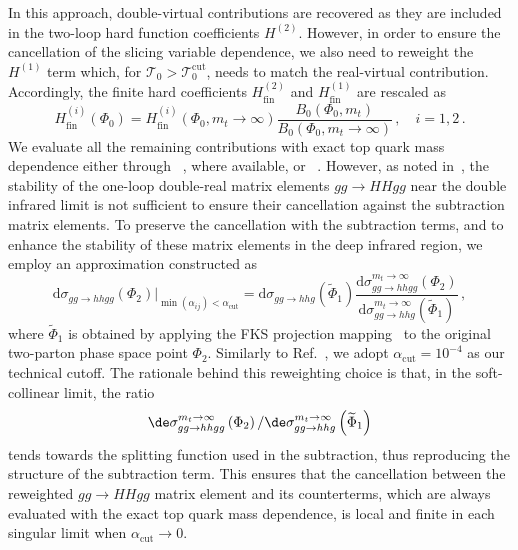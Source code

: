 In this approach, double-virtual contributions are recovered as they are included in the
two-loop hard function coefficients $H^{(2)}$.
However, in order to ensure the cancellation of the slicing variable dependence, we also need
to reweight the $H^{(1)}$ term which, for $\mathcal{T}_0>\mathcal{T}_0^{\mathrm{cut}}$,
needs to match the real-virtual contribution.
Accordingly, the finite hard coefficients $H^{(2)}_{\mathrm{fin}}$ and
$H^{(1)}_{\mathrm{fin}}$ are rescaled as
\begin{equation}
  \label{eq:twoloophard}
  H^{(i)}_{\mathrm{fin}}(\Phi_0) = H^{(i)}_{\mathrm{fin}}\left(\Phi_0,m_t\to\infty\right)
  \frac{B_0\left(\Phi_0,m_t\right)}
  {B_0\left(\Phi_0,m_t\to\infty\right)}\,, \quad i=1,2\,.
\end{equation}
We evaluate all the remaining contributions with exact top quark mass dependence
either through \openloops~\cite{Cascioli:2011va,Buccioni:2017yxi,Buccioni:2019sur}, where available, or \hhgrid~\cite{Borowka:2016ehy,Borowka:2016ypz,Heinrich:2017kxx,Davies:2019dfy}.
However, as noted in~\cite{Grazzini:2018bsd}, the stability of the one-loop double-real
matrix elements $gg \to HH gg$ near the double infrared limit is not sufficient
to ensure their cancellation against the subtraction matrix elements.
To preserve the cancellation with the subtraction terms, and to enhance
the stability of these matrix elements in the deep infrared region, we employ
an approximation constructed as
\begin{equation}
  {\mathrm{d}\sigma_{gg\to hh
      gg}\left(\Phi_2\right)\Biggr|}_{\min(\alpha_{ij})<\alpha_{\mathrm{cut}}}
  = {\mathrm{d}\sigma_{gg\to hh g}\left(\widetilde{\Phi}_1\right)}
  \frac{\mathrm{d}\sigma_{gg\to hhgg}^{m_t\to\infty}\left(\Phi_2\right)}
  {\mathrm{d}\sigma_{gg\to hh g}^{m_t\to\infty}\left(\widetilde{\Phi}_1\right)} \,,
\end{equation}
where $\widetilde{\Phi}_1$ is obtained by applying the
FKS projection mapping~\cite{Frixione:1995ms} to the original
two-parton phase space point $\Phi_2$.
Similarly to Ref.~\cite{Grazzini:2018bsd}, we adopt $\alpha_{\mathrm{cut}} = 10^{-4}$ as our technical cutoff.
The rationale behind this reweighting choice is that, in
the soft-collinear limit, the ratio 
\begin{equation}
\de\sigma_{gg\to hhgg}^{m_t\to\infty}\left(\Phi_2\right)
/{\de\sigma_{gg\to hh g}^{m_t\to\infty}\left(\widetilde{\Phi}_1\right)}
\end{equation} 
tends towards
the splitting function used in the subtraction, thus reproducing the structure of
the subtraction term.
This ensures that the cancellation between the reweighted $gg\to HHgg$ matrix element and its
counterterms, which are always evaluated with the exact top quark mass dependence, is local and
finite in each singular limit when $\alpha_{\mathrm{cut}} \to 0$.

